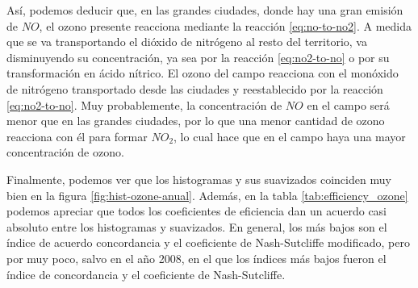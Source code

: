 \documentclass[12pt]{article}
\begin{document}
Así, podemos deducir que, en las grandes ciudades, donde hay una gran emisión de $NO$, el ozono presente reacciona mediante la reacción \ref{eq:no-to-no2}. A medida que se va transportando el dióxido de nitrógeno al resto del territorio, va disminuyendo su concentración, ya sea por la reacción \ref{eq:no2-to-no} o por su transformación en ácido nítrico. El ozono del campo reacciona con el monóxido de nitrógeno transportado desde las ciudades y reestablecido por la reacción \ref{eq:no2-to-no}. Muy probablemente, la concentración de $NO$ en el campo será menor que en las grandes ciudades, por lo que una menor cantidad de ozono reacciona con él para formar $NO_{2}$, lo cual hace que en el campo haya una mayor concentración de ozono.

Finalmente, podemos ver que los histogramas y sus suavizados coinciden muy bien en la figura \ref{fig:hist-ozone-anual}. Además, en la tabla \ref{tab:efficiency_ozone} podemos apreciar que todos los coeficientes de eficiencia dan un acuerdo casi absoluto entre los histogramas y suavizados. En general, los más bajos son el índice de acuerdo concordancia y el coeficiente de Nash-Sutcliffe modificado, pero por muy poco, salvo en el año 2008, en el que los índices más bajos fueron el índice de concordancia y el coeficiente de Nash-Sutcliffe.
\end{document}
